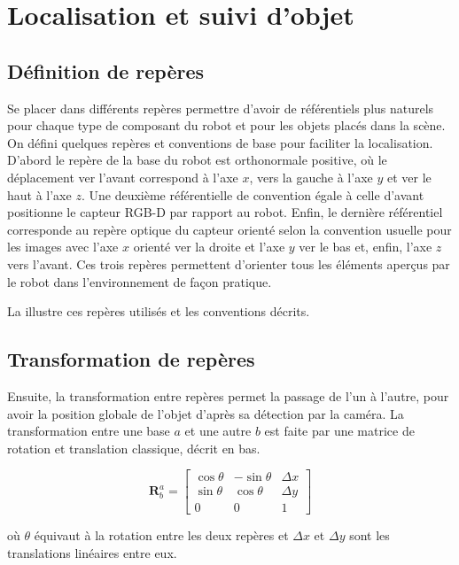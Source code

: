 \section{Localisation et suivi d'objet}

\subsection{Définition de repères}

Se placer dans différents repères permettre d'avoir de référentiels plus naturels pour chaque type de composant du robot et pour les objets placés dans la scène. On défini quelques repères et conventions de base pour faciliter la localisation. D'abord le repère de la base du robot est orthonormale positive, où le déplacement ver l'avant correspond à l'axe $x$, vers la gauche à l'axe $y$ et ver le haut à l'axe $z$. Une deuxième référentielle de convention égale à celle d'avant positionne le capteur RGB-D par rapport au robot. Enfin, le dernière référentiel corresponde au repère optique du capteur orienté selon la convention usuelle pour les images avec l'axe $x$ orienté ver la droite et l'axe $y$ ver le bas et, enfin, l'axe $z$ vers l'avant. Ces trois repères permettent d'orienter tous les éléments aperçus par le robot dans l'environnement de façon pratique.

La  illustre ces repères utilisés et les conventions décrits.

\subsection{Transformation de repères}

Ensuite, la transformation entre repères permet la passage de l'un à l'autre, pour avoir la position globale de l'objet d'après sa détection par la caméra. La transformation entre une base $a$ et une autre $b$ est faite par une matrice de rotation et translation classique, décrit en bas. 

\begin{equation*}
	\mathbf{R}^{a}_{b} = 
	\begin{bmatrix} 
	 	\cos \theta &  -\sin \theta & \Delta x \\ \sin \theta & \cos \theta & \Delta y \\ 0 & 0 & 1
	 \end{bmatrix}
\end{equation*}

où $\theta$ équivaut à la rotation entre les deux repères et $\Delta x$ et $\Delta y$ sont les translations linéaires entre eux.

